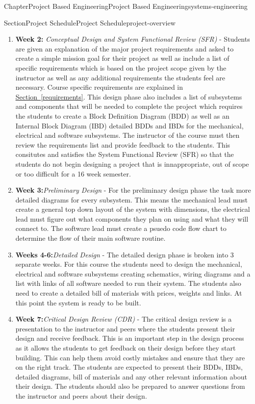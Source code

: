 \documentclass[oneside,10pt,]{book}
\newcommand{\xreffont}{\relax}
\newcommand{\linkhilite}[1]{\underline{#1}}
\newcommand{\terminology}[1]{\textbf{#1}}
\numberwithin{equation}{section}
\begin{document}
\begin{chapterptx}{Chapter}{Project Based Engineering}{}{Project Based Engineering}{}{}{systems-engineering}
\begin{sectionptx}{Section}{Project Schedule}{}{Project Schedule}{}{}{project-overview}
\begin{enumerate}
\item{}\terminology{Week 2:} \emph{Conceptual Design and System Functional Review (SFR)} - Students are given an explanation of the major project requirements and asked to create a simple mission goal for their project as well as include a list of specific requirements which is based on the project scope given by the instructor as well as any additional requirements the students feel are necessary. Course specific requirements are explained in \hyperref[requirements]{\linkhilite{Section~{\xreffont\ref{requirements}}}}. This design phase also includes a list of subsystems and components that will be needed to complete the project which requires the students to create a Block Definition Diagram (BDD) as well as an Internal Block Diagram (IBD) detailed BDDs and IBDs for the mechanical, electrical and software subsystems. The instructor of the course must then review the requirements list and provide feedback to the students. This consitutes and satisfies the System Functional Review (SFR) so that the students do not begin designing a project that is innappropriate, out of scope or too difficult for a 16 week semester.%
\item{}\terminology{Week 3:}\emph{Preliminary Design} - For the preliminary design phase the task more detailed diagrams for every subsystem. This means the mechanical lead must create a general top down layout of the system with dimensions, the electrical lead must figure out what components they plan on using and what they will connect to. The software lead must create a psuedo code flow chart to determine the flow of their main software routine.%
\item{}\terminology{Weeks 4-6:}\emph{Detailed Design} - The detailed design phase is broken into 3 separate weeks. For this course the students need to design the mechanical, electrical and software subsystems creating schematics, wiring diagrams and a list with links of all software needed to run their system. The students also need to create a detailed bill of materials with prices, weights and links. At this point the system is ready to be built.%
\item{}\terminology{Week 7:}\emph{Critical Design Review (CDR)} - The critical design review is a presentation to the instructor and peers where the students present their design and receive feedback. This is an important step in the design process as it allows the students to get feedback on their design before they start building. This can help them avoid costly mistakes and ensure that they are on the right track. The students are expected to present their BDDs, IBDs, detailed diagrams, bill of materials and any other relevant information about their design. The students should also be prepared to answer questions from the instructor and peers about their design.%

\end{enumerate}
\end{sectionptx}
\end{chapterptx}
\end{document}
